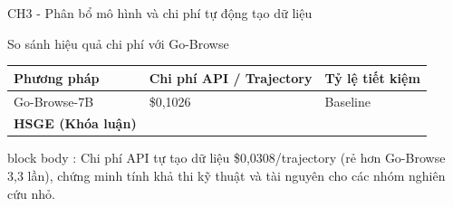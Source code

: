 \begin{frame}{CH3 - Phân bổ mô hình và chi phí tự động tạo dữ liệu}
  \vspace{-0.05cm}
  \begin{block}{So sánh hiệu quả chi phí với Go-Browse}
    \centering
    \vspace{-0.05cm}
    \setlength{\tabcolsep}{8pt}
    \scriptsize
    \begin{tabular}{@{}L{3.2cm} C{4.0cm} R{2.6cm}@{}}
      \toprule
      \textbf{Phương pháp} & \textbf{Chi phí API / Trajectory} & \textbf{Tỷ lệ tiết kiệm} \\
      \midrule
      Go-Browse-7B & \$0,1026 & Baseline \\
      \textbf{HSGE (Khóa luận)} &  &  \\
      \bottomrule
    \end{tabular}
    \vspace{0.01cm}
  \end{block}

  \vspace{0.02cm}
  \begin{beamercolorbox}[wd=\textwidth,sep=2pt,leftskip=6pt,rightskip=6pt,rounded=true]{block body}
    \scriptsize {}: Chi phí API tự tạo dữ liệu \$0,0308/trajectory (rẻ hơn Go-Browse 3,3 lần), chứng minh tính khả thi kỹ thuật và tài nguyên cho các nhóm nghiên cứu nhỏ.
  \end{beamercolorbox}
\end{frame}
